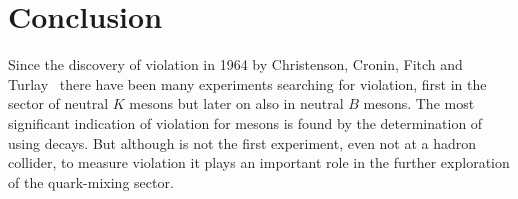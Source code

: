 
\chapter{Conclusion}
\label{sec:conclusion}

Since the discovery of \CP violation in 1964 by Christenson, Cronin, Fitch and
Turlay~\cite{CPV_discovery} there have been many experiments searching for \CP
violation, first in the sector of neutral $K$ mesons but later on also in
neutral $B$ mesons. The most significant indication of \CP violation for \Bz
mesons is found by the determination of \sintwobeta using \BdToJPsiKS decays.
But although \lhcb is not the first experiment, even not at a hadron collider,
to measure \CP violation it plays an important role in the further exploration
of the quark-mixing sector.

